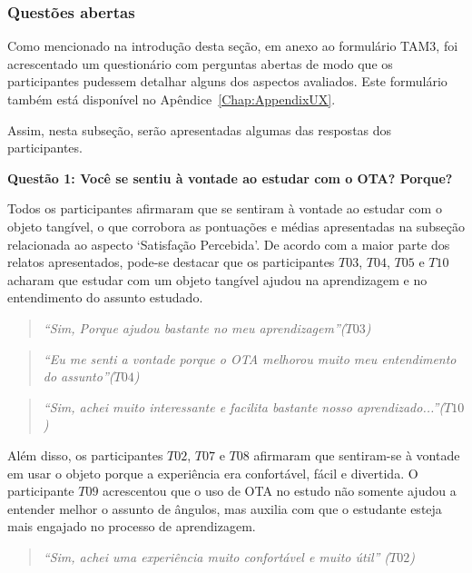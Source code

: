\subsubsection{Questões abertas}\label{sub:TAM3-abertas}

Como mencionado na introdução desta seção, em anexo ao formulário TAM3, foi acrescentado um questionário com perguntas abertas de modo que os participantes pudessem detalhar alguns dos aspectos avaliados. Este formulário também está disponível no Apêndice~\ref{Chap:AppendixUX}.

Assim, nesta subseção, serão apresentadas algumas das respostas dos participantes.

\textbf{Questão 1: Você se sentiu à vontade ao estudar com o OTA? Porque?}

Todos os participantes afirmaram que se sentiram à vontade ao estudar com o objeto tangível, o que corrobora as pontuações e médias apresentadas na subseção relacionada ao aspecto `Satisfação Percebida'. De acordo com a maior parte dos relatos apresentados, pode-se destacar que os participantes $T03$, $T04$, $T05$ e $T10$ acharam que estudar com um objeto tangível ajudou na aprendizagem e no entendimento do assunto estudado.

\begin{quote}
	\textit{``Sim, Porque ajudou bastante no meu aprendizagem''($T03$)}
\end{quote}

\begin{quote}
	\textit{``Eu me senti a vontade porque o OTA melhorou muito meu entendimento do assunto''($T04$)}
\end{quote}

\begin{quote}
	\textit{``Sim, achei muito interessante e facilita bastante nosso aprendizado...''($T10$)}
\end{quote}

Além disso, os participantes $T02$, $T07$ e $T08$ afirmaram que sentiram-se à vontade em usar o objeto porque a experiência era confortável, fácil e divertida. O participante $T09$ acrescentou que o uso de OTA no estudo não somente ajudou a entender melhor o assunto de ângulos, mas auxilia com que o estudante esteja mais engajado no processo de aprendizagem.

\begin{quote}
\textit{``Sim, achei uma experiência muito confortável e muito útil'' ($T02$)}
\end{quote}

